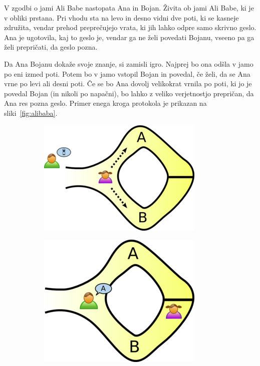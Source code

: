 \begin{primer}
    V zgodbi o jami Ali Babe nastopata Ana in Bojan. Živita ob jami Ali Babe, ki je v obliki prstana. 
    Pri vhodu sta na levo in desno vidni dve poti, ki se kasneje združita, vendar prehod preprečujejo 
    vrata, ki jih lahko odpre samo skrivno geslo. Ana je ugotovila, kaj to geslo je, vendar ga ne želi 
    povedati Bojanu, vseeno pa ga želi prepričati, da geslo pozna. 

    Da Ana Bojanu dokaže svoje znanje, si zamisli igro. Najprej bo ona odšla v jamo po eni izmed poti. 
    Potem bo v jamo vstopil Bojan in povedal, če želi, da se Ana vrne po levi ali desni poti. Če se 
    bo Ana dovolj velikokrat vrnila po poti, ki jo je povedal Bojan (in nikoli po napačni), bo lahko 
    z veliko verjetnostjo prepričan, da Ana res pozna geslo. Primer enega kroga protokola je prikazan 
    na sliki~\ref{fig:alibaba}. 
    \begin{figure}[ht]
      \centering
        \begin{subfigure}{0.28\textwidth}
            \includegraphics[width=\textwidth]{images/zkp1.png}
        \end{subfigure}
        \hspace{0.25cm}
        \begin{subfigure}{0.25\textwidth}
            \includegraphics[width=\textwidth]{images/zkp2.png}

\end{subfigure}
\end{figure}
\end{primer}
